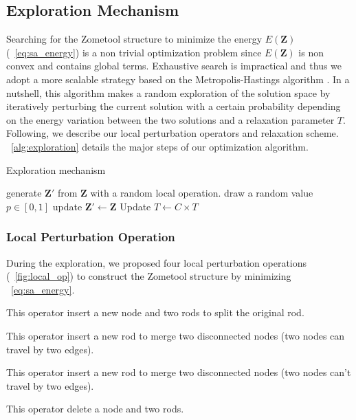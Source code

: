 \subsection{Exploration Mechanism}
Searching for the Zometool structure to minimize the energy $E(\mathbf{Z})$ (\eqname~\ref{eq:sa_energy}) is a non trivial optimization problem since $E(\mathbf{Z})$ is non convex and contains global terms. 
Exhaustive search is impractical and thus we adopt a more scalable strategy based on the Metropolis-Hastings algorithm \cite{hastings:1970:monte}.
In a nutshell, this algorithm makes a random exploration of the solution space by iteratively perturbing the current solution with a certain probability depending on the energy variation between the two solutions and a relaxation parameter $T$.
Following, we describe our local perturbation operators and relaxation scheme.
\algoname~\ref{alg:exploration} details the major steps of our optimization algorithm.

\begin{algorithm}[!ht]
\caption{Exploration mechanism}
\label{alg:exploration}
\begin{algorithmic}[1]
\Repeat
    \State generate $\mathbf{Z}'$ from $\mathbf{Z}$ with a random local operation.
    \State draw a random value $p \in [0, 1]$ 
        \State update $\mathbf{Z}' \leftarrow \mathbf{Z}$
    \EndIf
    \State Update $T \leftarrow C\times T$ 
\EndProcedure
\end{algorithmic}
\end{algorithm}

\subsubsection{Local Perturbation Operation}
During the exploration, we proposed four local perturbation operations (\figname~\ref{fig:local_op}) to construct the Zometool structure by minimizing \eqname~\ref{eq:sa_energy}.
\begin{description}[nosep,itemsep=0pt,leftmargin=0pt]
\item[Split] This operator insert a new node and  two rods to split the original rod.
\item[Merge] This operator insert a new rod to merge two disconnected nodes (two nodes can travel by two edges). 
\item[Bridge] This operator insert a new rod to merge two disconnected nodes (two nodes can't travel by two edges).
\item[Kill] This operator delete a node and two rods.
\end{description}

